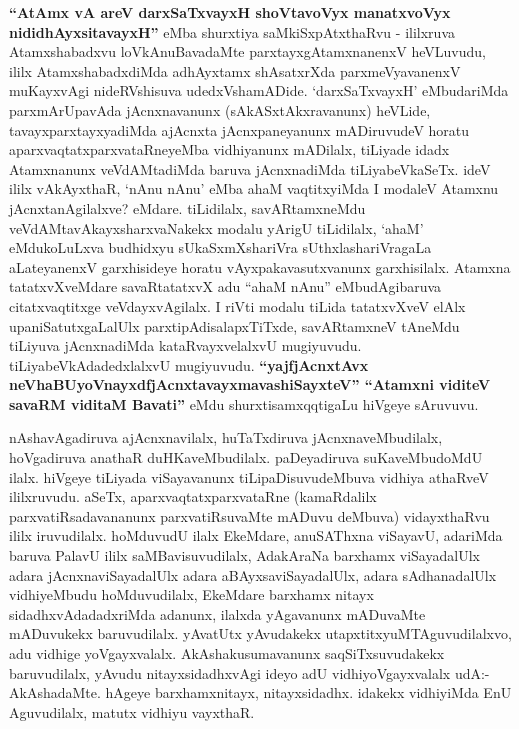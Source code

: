 \begin{artha}
\textbf{``AtAmx vA areV darxSaTxvayxH shoVtavoVyx manatxvoVyx nididhAyxsitavayxH''} eMba shurxtiya saMkiSxpAtxthaRvu -
ililxruva Atamxshabadxvu loVkAnuBavadaMte parxtayxgAtamxnanenxV
heVLuvudu, ililx AtamxshabadxdiMda adhAyxtamx shAsatxrXda
parxmeVyavanenxV muKayxvAgi nideRVshisuva udedxVshamADide. `darxSaTxvayxH'
eMbudariMda parxmArUpavAda jAcnxnavanunx  (sAkASxtAkxravanunx) heVLide,
tavayxparxtayxyadiMda ajAcnxta jAcnxpaneyanunx mADiruvudeV
horatu aparxvaqtatxparxvataRneyeMba vidhiyanunx mADilalx, tiLiyade
idadx Atamxnanunx veVdAMtadiMda baruva jAcnxnadiMda
tiLiyabeVkaSeTx. ideV ililx vAkAyxthaR, `nAnu nAnu' eMba ahaM
vaqtitxyiMda I modaleV Atamxnu jAcnxtanAgilalxve? eMdare. tiLidilalx,
savARtamxneMdu veVdAMtavAkayxsharxvaNakekx modalu yArigU tiLidilalx,
`ahaM' eMdukoLuLxva budhidxyu sUkaSxmXshariVra sUthxlashariVragaLa
aLateyanenxV garxhisideye horatu vAyxpakavasutxvanunx
garxhisilalx. Atamxna tatatxvXveMdare savaRtatatxvX adu ``ahaM nAnu''
eMbudAgibaruva citatxvaqtitxge veVdayxvAgilalx. I riVti
modalu tiLida tatatxvXveV elAlx upaniSatutxgaLalUlx
parxtipAdisalapxTiTxde, savARtamxneV tAneMdu tiLiyuva jAcnxnadiMda
kataRvayxvelalxvU mugiyuvudu. tiLiyabeVkAdadedxlalxvU mugiyuvudu.
\textbf{``yajfjAcnxtAvx neVhaBUyoV\s nayxdfjAcnxtavayxmavashiSayxteV'' ``Atamxni viditeV savaRM viditaM Bavati''} eMdu shurxtisamxqqtigaLu hiVgeye sAruvuvu.
\end{artha}

\centerline{}

\begin{artha}
nAshavAgadiruva ajAcnxnavilalx, huTaTxdiruva jAcnxnaveMbudilalx,
hoVgadiruva  anathaR duHKaveMbudilalx. paDeyadiruva
suKaveMbudoMdU ilalx. hiVgeye tiLiyada viSayavanunx tiLipaDisuvudeMbuva
vidhiya athaRveV ililxruvudu. aSeTx, aparxvaqtatxparxvataRne
(kamaRdalilx parxvatiRsadavananunx parxvatiRsuvaMte mADuvu deMbuva)
vidayxthaRvu ililx iruvudilalx. hoMduvudU ilalx EkeMdare, anuSAThxna
viSayavU, adariMda baruva PalavU ililx saMBavisuvudilalx, AdakAraNa
barxhamx viSayadalUlx adara jAcnxnaviSayadalUlx adara
aBAyxsaviSayadalUlx, adara \-sAdhanadalUlx vidhiyeMbudu hoMduvudilalx,
EkeMdare barxhamx nitayx sidadhxvAdadadxriMda adanunx, ilalxda
yAgavanunx mADuvaMte mADuvukekx baruvudilalx. yAvatUtx  yAvudakekx
utapxtitxyuMTAguvudilalxvo, adu vidhige yoVgayxvalalx.
AkAshakusumavanunx saqSiTxsuvudakekx baruvudilalx, yAvudu
nitayxsidadhxvAgi ideyo adU vidhiyoVgayxvalalx udA:- AkAshadaMte.
hAgeye barxhamxnitayx, nitayxsidadhx. idakekx vidhiyiMda EnU
Aguvudilalx, matutx vidhiyu vayxthaR. 
\end{artha}

